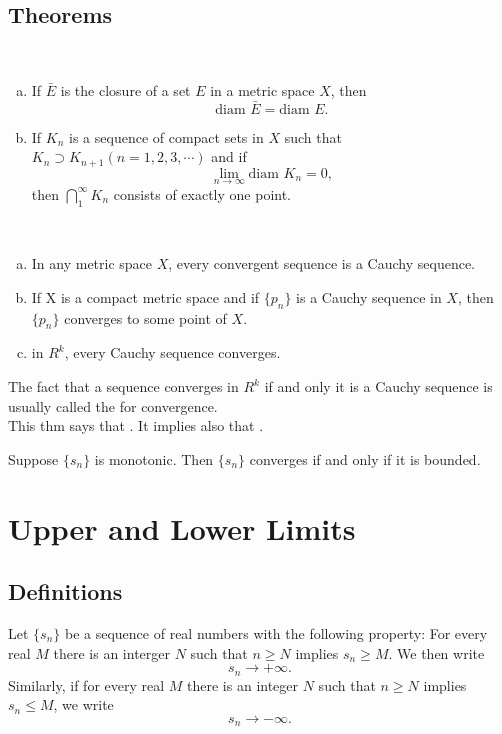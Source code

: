 \subsection{Theorems}
\begin{thm}
	~
	\begin{enumerate}[(a)]
		\item If $\bar E$ is the closure of a set $E$ in a metric space $X$, then $$\text{diam } \bar E = \text{diam }E.$$
		\item If $K_n$ is a sequence of compact sets in $X$ such that $K_n \supset K_{n+1} (n=1,2,3,\cdots)$ and if $$\lim_{n \to \infty} \text{diam } K_n =0,$$ then $\bigcap_1^\infty K_n$ consists of exactly one point.
	\end{enumerate}
\end{thm}

\begin{thm}
	~
	\begin{enumerate}[(a)]
		\item In any metric space $X$, every convergent sequence is a Cauchy sequence.
		\item If X is a compact metric space and if $\{p_n\}$ is a Cauchy sequence in $X$, then $\{p_n\}$ converges to some point of $X$.
		\item in $R^k$, every Cauchy sequence converges.
	\end{enumerate}
	The fact that a sequence converges in $R^k$ if and only it is a Cauchy sequence is usually called the {} for convergence.\\
	This thm says that {}. It implies also that {}.  
\end{thm}

\begin{thm}
	Suppose $\{s_n\}$ is monotonic. Then $\{s_n\}$ converges if and only if it is bounded.
\end{thm}

\section{Upper and Lower Limits}
\subsection{Definitions}
\begin{deff}
	Let $\{s_n\}$ be a sequence of real numbers with the following property: For every real $M$ there is an interger $N$ such that $n\geq N$ implies $s_n \geq M$. We then write $$s_n\to+\infty.$$ Similarly, if for every real $M$ there is an integer $N$ such that $n\geq N$ implies $s_n\leq M$, we write $$s_n\to-\infty.$$
\end{deff}

